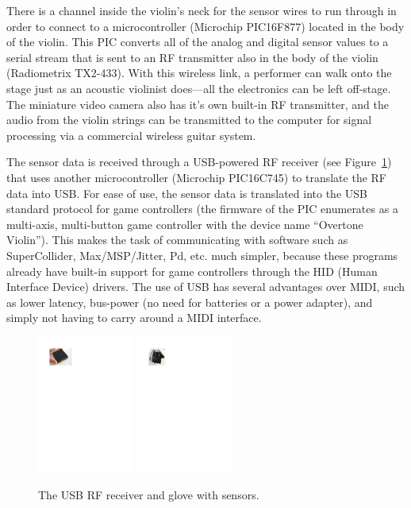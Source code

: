 There is a channel inside the violin's neck for the sensor wires to run through
in order to connect to a microcontroller (Microchip PIC16F877) located in the
body of the violin. This PIC converts all of the analog and digital sensor values
to a serial stream that is sent to an RF transmitter also in the body of the
violin (Radiometrix TX2-433). With this wireless link, a performer can walk onto
the stage just as an acoustic violinist does---all the electronics can be left
off-stage. The miniature video camera also has it's own built-in RF transmitter,
and the audio from the violin strings can be transmitted to the computer for
signal processing via a commercial wireless guitar system.

The sensor data is received through a USB-powered RF receiver (see Figure~\ref{Overholt:fig:4})
that uses another microcontroller (Microchip PIC16C745) to translate the RF data
into USB. For ease of use, the sensor data is translated into the USB standard
protocol for game controllers (the firmware of the PIC enumerates as a
multi-axis, multi-button game controller with the device name ``Overtone
Violin''). This makes the task of communicating with software such as
SuperCollider, Max/MSP/Jitter, Pd, etc. much simpler, because these programs
already have built-in support for game controllers through the HID (Human
Interface Device) drivers. The use of USB has several advantages over MIDI, such
as lower latency, bus-power (no need for batteries or a power adapter), and
simply not having to carry around a MIDI interface.

\begin{figure}[t]
\centering
\includegraphics[height=45mm]{img-5-eps-converted-to.pdf}
\includegraphics[height=45mm]{img-6-eps-converted-to.pdf}
\caption{The USB RF receiver and glove with sensors.}
\label{Overholt:fig:4} 
\end{figure}

